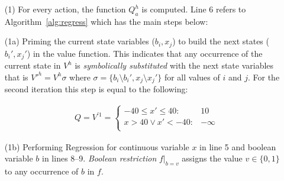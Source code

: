 \begin{itemize}
\item[(1)] For every action, the function $Q^h_a$ is computed. Line 6 refers to Algorithm~\ref{alg:regress} which has the main steps below:

(1a) Priming the current state variables ($b_i,x_j$) to build the next states ($b_i',x_j'$) in the value function. This indicates that any occurrence of the current state in $V^h$ is \emph{symbolically substituted} with the next state variables that is $V'^h= V^h \sigma$ where $\sigma = \lbrace b_i \setminus b_i' , x_j \setminus x_j' \rbrace$ for all values of $i$ and $j$. For the second iteration this step is equal to the following: 

\begin{align}
Q = V^{'1} =  
\begin{cases}
  -40 \leq x' \leq 40: & 10 \\ 
 x>40 \lor x'<-40 : & -\infty \\ 
\end{cases} \nonumber
\end{align}

(1b) Performing Regression for continuous variable $x$ in line 5 and boolean variable $b$ in lines 8--9. \emph{Boolean restriction} $f|_{b=v}$ assigns the value $v \in \{ 0,1 \}$ to any occurrence of $b$ in $f$. 


\end{itemize}
